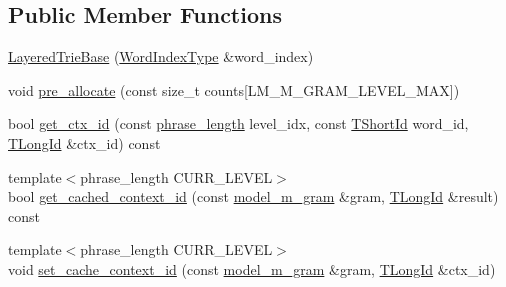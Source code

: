 \subsection*{Public Member Functions}
\begin{DoxyCompactItemize}
\item 
\hyperlink{classuva_1_1smt_1_1bpbd_1_1server_1_1lm_1_1_layered_trie_base_a29694fe03ccfe2c139c1dd18328e1550}{Layered\+Trie\+Base} (\hyperlink{classuva_1_1smt_1_1bpbd_1_1server_1_1lm_1_1_word_index_trie_base_a77ee32bf3a9f8a89558bda4f2031200c}{Word\+Index\+Type} \&word\+\_\+index)
\item 
void \hyperlink{classuva_1_1smt_1_1bpbd_1_1server_1_1lm_1_1_layered_trie_base_a5ef24d3706e1b539c7f3daf9184b4af3}{pre\+\_\+allocate} (const size\+\_\+t counts\mbox{[}L\+M\+\_\+\+M\+\_\+\+G\+R\+A\+M\+\_\+\+L\+E\+V\+E\+L\+\_\+\+M\+A\+X\mbox{]})
\item 
bool \hyperlink{classuva_1_1smt_1_1bpbd_1_1server_1_1lm_1_1_layered_trie_base_a1e3142542ae5fbe0058d77ebfd71f2af}{get\+\_\+ctx\+\_\+id} (const \hyperlink{namespaceuva_1_1smt_1_1bpbd_1_1server_af068a19c2e03116caf3e3827a3e40e35}{phrase\+\_\+length} level\+\_\+idx, const \hyperlink{namespaceuva_1_1smt_1_1bpbd_1_1server_1_1lm_1_1identifiers_a33043a191e9a637dea742a89d23c8bdc}{T\+Short\+Id} word\+\_\+id, \hyperlink{namespaceuva_1_1smt_1_1bpbd_1_1server_1_1lm_1_1identifiers_a6841847096e455ad3c38689bc548b3b0}{T\+Long\+Id} \&ctx\+\_\+id) const 
\item 
{\footnotesize template$<$phrase\+\_\+length C\+U\+R\+R\+\_\+\+L\+E\+V\+E\+L$>$ }\\bool \hyperlink{classuva_1_1smt_1_1bpbd_1_1server_1_1lm_1_1_layered_trie_base_ab35898f5f5e2ee5d32c0fabf7d741abd}{get\+\_\+cached\+\_\+context\+\_\+id} (const \hyperlink{classuva_1_1smt_1_1bpbd_1_1server_1_1lm_1_1m__grams_1_1model__m__gram}{model\+\_\+m\+\_\+gram} \&gram, \hyperlink{namespaceuva_1_1smt_1_1bpbd_1_1server_1_1lm_1_1identifiers_a6841847096e455ad3c38689bc548b3b0}{T\+Long\+Id} \&result) const 
\item 
{\footnotesize template$<$phrase\+\_\+length C\+U\+R\+R\+\_\+\+L\+E\+V\+E\+L$>$ }\\void \hyperlink{classuva_1_1smt_1_1bpbd_1_1server_1_1lm_1_1_layered_trie_base_a5092129cc86d53c81321715ee2075c7f}{set\+\_\+cache\+\_\+context\+\_\+id} (const \hyperlink{classuva_1_1smt_1_1bpbd_1_1server_1_1lm_1_1m__grams_1_1model__m__gram}{model\+\_\+m\+\_\+gram} \&gram, \hyperlink{namespaceuva_1_1smt_1_1bpbd_1_1server_1_1lm_1_1identifiers_a6841847096e455ad3c38689bc548b3b0}{T\+Long\+Id} \&ctx\+\_\+id)
\end{DoxyCompactItemize}
